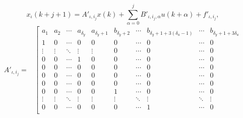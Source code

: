 \begin{equation}\label{eqLTIleavesSinglState}
	x_\iota(k+j+1) = A'_{\iota,i_j}x(k) + \sum_{\alpha = 0}^{j}{B'_{\iota,i_j,\alpha}u(k+\alpha)} + f'_{\iota,i_j},
\end{equation}
\normalsize
\small
\begin{equation}\label{eqLeafModel}
\begin{aligned}
A'_{\iota,i_j} =& \left[\begin{array}{cccccccccc}
a_1       & a_2       & \cdots & a_{\delta_y } & a_{\delta_y + 1} & b_{\delta_y + 2} & \cdots & b_{\delta_y + 1+ 3(\delta_u-1)} & \cdots & b_{\delta_y + 1 + 3\delta_u} \\
1         & 0         & \cdots & 0             & 0                & 0                & \cdots & 0                               & \cdots & 0                            \\
\vdots    & \vdots    & \ddots & \vdots        & \vdots           & 0                & \cdots & 0                               & \cdots & 0                            \\
0         & 0         & \cdots & 1             & 0                & 0                & \cdots & 0                               & \cdots & 0                            \\
0         & 0         & \cdots & 0             & 0                & 0                & \cdots & 0                               & \cdots & 0                            \\
0         & 0         & \cdots & 0             & 0                & 0                & \cdots & 0                               & \cdots & 0                            \\
0         & 0         & \cdots & 0             & 0                & 0                & \cdots & 0                               & \cdots & 0                            \\
0         & 0         & \cdots & 0             & 0                & 1                & \cdots & 0                               & \cdots & 0                            \\
\vdots    & \vdots    & \ddots & \vdots        & \vdots           & \vdots           & \ddots & \vdots                          & \ddots & \vdots                       \\
0         & 0         & \cdots & 0             & 0                & 0                & \cdots & 1                               & \cdots & 0                            \\


\end{array}
\end{aligned}
\end{equation}
